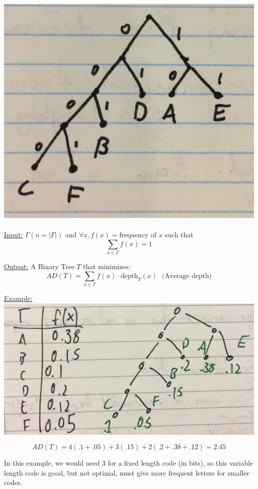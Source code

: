 \documentclass[12pt]{article}
\begin{document}
\includegraphics[scale=0.25]{lec4-1}\\
\\
\underline{Input:} $\Gamma (n = |\Gamma|)$ and $\forall x, f(x) = $frequency of $x$ such that $$\sum_{x\in\Gamma} f(x) =1$$

\underline{Output:} A Binary Tree $T$ that minimizes: $$AD(T) = \sum_{x\in\Gamma} f(x)\cdot \text{depth}_T(x) \:\:\:\text{(Average depth)}$$

\underline{Example:}\\
\includegraphics[scale=0.125]{lec4-2}

$$AD(T) = 4(.1 + .05) + 3(.15) + 2(.2 + .38 + .12) = 2.45$$

In this example, we would need 3 for a fixed length code (in bits), so this variable length code is good, but not optimal, must give more frequent letters for smaller codes.
\end{document}
